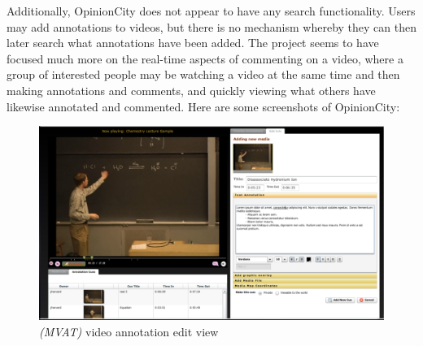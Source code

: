 Additionally, OpinionCity does not appear to have any search functionality.  Users may add annotations to videos, but there is no mechanism whereby they can then later search what annotations have been added.  The project seems to have focused much more on the real-time aspects of commenting on a video, where a group of interested people may be watching a video at the same time and then making annotations and comments, and quickly viewing what others have likewise annotated and commented.  Here are some screenshots of OpinionCity:





\begin{figure}[!ht]
	\includegraphics[width=\textwidth]{gfx/mvat/mvat-annotation-edit-view.png}
	\caption{\textit{(MVAT)} video annotation edit view} 
	\label{fig:mvat:video-annotation-edit-view}
\end{figure} 

